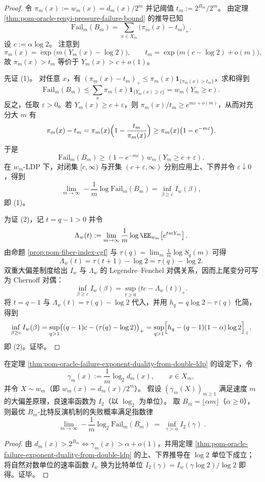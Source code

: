 \begin{proof}
令 \(\pi_m(x):=w_m(x)=d_m(x)/2^m\) 并记阈值 \(t_m:=2^{B_m}/2^m\)。
由定理 \ref{thm:pom-oracle-renyi-pressure-failure-bound} 的推导已知
\[
\mathrm{Fail}_m(B_m)=\sum_{x\in X_m}\bigl(\pi_m(x)-t_m\bigr)_+.
\]
设 \(c:=\alpha\log 2\)。
注意到
\[
\pi_m(x)=\exp\bigl(m(Y_m(x)-\log 2)\bigr),
\qquad
t_m=\exp\bigl(m(c-\log 2)+o(m)\bigr),
\]
故 \(\pi_m(x)>t_m\) 等价于 \(Y_m(x)>c+o(1)\)。
\par
先证 (1)。
对任意 \(x\)，有 \((\pi_m(x)-t_m)_+\le \pi_m(x)\mathbf 1_{\{\pi_m(x)>t_m\}}\)，求和得到
\[
\mathrm{Fail}_m(B_m)\le \sum_x \pi_m(x)\mathbf 1_{\{Y_m(x)\ge c\}}=w_m(Y_m\ge c).
\]
反之，任取 \(\varepsilon>0\)。若 \(Y_m(x)\ge c+\varepsilon\)，则 \(\pi_m(x)/t_m\ge e^{m\varepsilon+o(m)}\)，从而对充分大 \(m\) 有
\[
\pi_m(x)-t_m=\pi_m(x)\Bigl(1-\frac{t_m}{\pi_m(x)}\Bigr)\ge \pi_m(x)\bigl(1-e^{-m\varepsilon}\bigr).
\]
于是
\[
\mathrm{Fail}_m(B_m)\ge (1-e^{-m\varepsilon})\,w_m(Y_m\ge c+\varepsilon).
\]
在 \(w_m\)-LDP 下，对闭集 \([c,\infty)\) 与开集 \((c+\varepsilon,\infty)\) 分别应用上、下界并令 \(\varepsilon\downarrow 0\)，得到
\[
\lim_{m\to\infty}-\frac1m\log \mathrm{Fail}_m(B_m)=\inf_{\beta\ge c} I_w(\beta),
\]
即 (1)。
\par
为证 (2)，记 \(t=q-1>0\) 并令
\[
\Lambda_w(t):=\lim_{m\to\infty}\frac1m\log \EE_{w_m}\!\left[e^{t m Y_m}\right].
\]
由命题 \ref{prop:pom-fiber-index-cgf} 与 \(\tau(q)=\lim_m \frac1m\log S_q(m)\) 可得
\[
\Lambda_w(t)=\tau(t+1)-\log 2=\tau(q)-\log 2.
\]
双重大偏差制度给出 \(I_w\) 与 \(\Lambda_w\) 的 Legendre--Fenchel 对偶关系，因而上尾变分可写为 Chernoff 对偶：
\[
\inf_{\beta\ge c}I_w(\beta)=\sup_{t\ge 0}\bigl(tc-\Lambda_w(t)\bigr)_+.
\]
将 \(t=q-1\) 与 \(\Lambda_w(t)=\tau(q)-\log 2\) 代入，并用 \(h_q=q\log 2-\tau(q)\) 化简，得到
\[
\inf_{\beta\ge c}I_w(\beta)
=\sup_{q>1}\bigl((q-1)c-(\tau(q)-\log 2)\bigr)_+
=\sup_{q>1}\Bigl[h_q-(q-1)(1-\alpha)\log 2\Bigr]_+,
\]
即 (2)。证毕。
\end{proof}

\begin{corollary}\label{cor:pom-oracle-failure-exponent-bit-ldp}
在定理 \ref{thm:pom-oracle-failure-exponent-duality-from-double-ldp} 的设定下，令
\[
\gamma_m(x):=\frac{1}{m}\log_2 d_m(x),
\qquad x\in X_m,
\]
并令 \(X\sim w_m\)（即 \(w_m(x)=d_m(x)/2^m\)）。
假设 \((\gamma_m(X))_{m\ge 1}\) 满足速度 \(m\) 的大偏差原理，良速率函数为 \(I_2\)（以 \(\log_2\) 为单位）。
取 \(B_m=\lfloor \alpha m\rfloor\)（\(\alpha\ge 0\)），则最优 \(B_m\)-比特反演机制的失败概率满足指数律
\[
\boxed{\;
\lim_{m\to\infty}-\frac{1}{m}\log_2 \mathrm{Fail}_m(B_m)
\;=\;
\inf_{\gamma>\alpha} I_2(\gamma)\; }.
\]
\end{corollary}
\begin{proof}
由 \(d_m(x)>2^{B_m}\iff \gamma_m(x)>\alpha+o(1)\)，并用定理 \ref{thm:pom-oracle-failure-exponent-duality-from-double-ldp} 的上、下界推导在 \(\log 2\) 单位下成立；将自然对数单位的速率函数 \(I_w\) 换为比特单位 \(I_2(\gamma)=I_w(\gamma\log 2)/\log 2\) 即得。证毕。
\end{proof}

